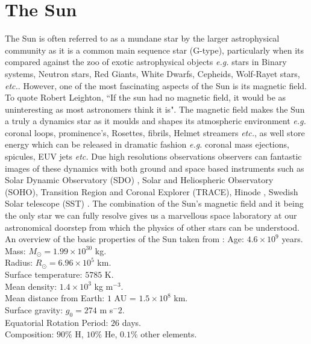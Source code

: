 \documentclass[12pt]{ociamthesis}
\newcommand{\np}{\\ \\}
\begin{document}
\section{The Sun}
\label{sec:Sun}
The Sun is often referred to as a mundane star by the larger astrophysical community as it is a common main sequence star (G-type), particularly when its compared against the zoo of exotic astrophysical objects \textit{e.g.} stars in Binary systems, Neutron stars, Red Giants, White Dwarfs, Cepheids, Wolf-Rayet stars, \textit{etc.}. However, one of the most fascinating aspects of the Sun is its magnetic field. To quote Robert Leighton, ``If the sun had no magnetic field, it would be as uninteresting as most astronomers think it is". The magnetic field makes the Sun a truly a dynamics star as it moulds and shapes its atmospheric environment \textit{e.g.} coronal loops, prominence's, Rosettes, fibrils, Helmet streamers \textit{etc.}, as well store energy which can be released in dramatic fashion \textit{e.g.} coronal mass ejections, spicules, EUV jets \textit{etc.} Due high resolutions observations observers can fantastic images of these dynamics with both ground and space based instruments such as Solar Dynamic Observatory (SDO) \citep{Lemen2012SoPh27517L}, Solar and Heliospheric Observatory (SOHO), Transition Region and Coronal Explorer (TRACE), Hinode \citep{Tsuneta2008SoPh,Suematsu2008SoPh,Ichimoto2008SoPh}, Swedish Solar telescope (SST) \citep{Scharmer2003SPIE}. The combination of the Sun's magnetic field and it being the only star we can fully resolve gives us a marvellous space laboratory at our astronomical doorstep from which the physics of other stars can be understood. An overview of the basic properties of the Sun taken from \cite{priest2014magnetohydrodynamics}:
Age: $4.6 \times 10^9$ years. \\
Mass: $M_{\odot}= 1.99 \times 10^{30}$ kg. \\
Radius: $R_{\odot} = 6.96 \times 10^5$ km. \\
Surface temperature: $5785$ K. \\
Mean density: $1.4 \times 10^3$ kg m$^{-3}$. \\
Mean distance from Earth: $1$ AU = $1.5 \times 10^8$ km. \\
Surface gravity: $g_{0}=274$ m s$^-2$. \\
Equatorial Rotation Period: $26$ days. \\
Composition: $90 \%$ H, $10 \%$ He, $0.1 \%$ other elements.\np
\end{document}
